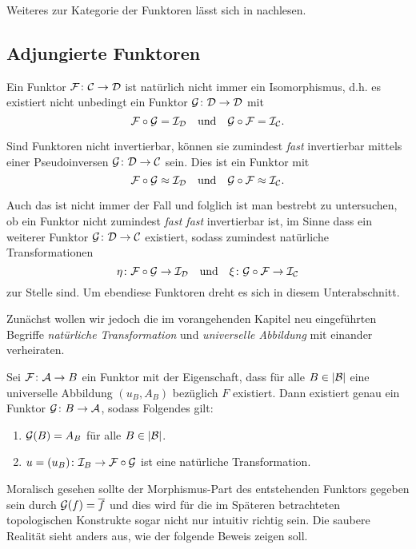 Weiteres zur Kategorie der Funktoren lässt sich in \cite{brandenburg} nachlesen.

\subsection{Adjungierte Funktoren}

Ein Funktor $\mathcal{F} \colon \mathcal{C} \to \mathcal{D}$ ist natürlich nicht immer ein Isomorphismus, d.h. es existiert nicht unbedingt ein Funktor $\mathcal{G} \colon \mathcal{D} \to \mathcal{D}$ mit
$$
\mathcal{F} \circ \mathcal{G} = \mathcal{I}_{\mathcal{D}} \quad\text{und}\quad \mathcal{G} \circ \mathcal{F} = \mathcal{I}_{\mathcal{C}}.
$$

Sind Funktoren nicht invertierbar, können sie zumindest \emph{fast} invertierbar mittels einer Pseudoinversen $\mathcal{G} \colon \mathcal{D} \to \mathcal{C}$ sein.
Dies ist ein Funktor mit 
$$\mathcal{F} \circ \mathcal{G} \approx \mathcal{I}_{\mathcal{D}} \quad\text{und}\quad \mathcal{G} \circ \mathcal{F} \approx \mathcal{I}_{\mathcal{C}}.$$

Auch das ist nicht immer der Fall und folglich ist man bestrebt zu untersuchen, ob ein Funktor nicht zumindest \emph{fast fast} invertierbar ist, im Sinne dass ein weiterer Funktor $\mathcal{G} \colon \mathcal{D} \to \mathcal{C}$ existiert, sodass zumindest natürliche Transformationen
$$
\eta \colon \mathcal{F} \circ \mathcal{G} \to \mathcal{I}_{\mathcal{D}} \quad\text{und}\quad \xi \colon \mathcal{G} \circ \mathcal{F} \to \mathcal{I}_{\mathcal{C}}
$$
zur Stelle sind.
Um ebendiese Funktoren dreht es sich in diesem Unterabschnitt.

Zunächst wollen wir jedoch die im vorangehenden Kapitel neu eingeführten Begriffe \emph{natürliche Transformation} und \emph{universelle Abbildung} mit einander verheiraten.

\begin{thm}
  Sei $\mathcal{F} \colon \mathcal{A} \to B$ ein Funktor mit der Eigenschaft, dass für alle $B \in |\mathcal{B}|$ eine universelle Abbildung $(u_B, A_B)$ bezüglich $F$ existiert.
  Dann existiert genau ein Funktor $\mathcal{G} \colon B \to \mathcal{A}$, sodass Folgendes gilt:
  \begin{enumerate}[(1)]
    \item $\mathcal{G}(B) = A_B$ für alle $B \in |\mathcal{B}|$.
    \item $u = (u_B) \colon \mathcal{I}_B \to \mathcal{F} \circ \mathcal{G}$ ist eine natürliche Transformation.
  \end{enumerate}
\end{thm}

Moralisch gesehen sollte der Morphismus-Part des entstehenden Funktors gegeben sein durch $\mathcal{G}(f) = \overline f$ und dies wird für die im Späteren betrachteten topologischen Konstrukte sogar nicht nur intuitiv richtig sein. 
Die saubere Realität sieht anders aus, wie der folgende Beweis zeigen soll.

